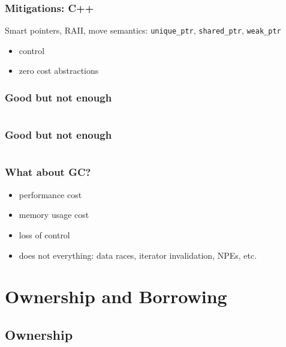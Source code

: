 \documentclass{beamer}
\begin{document}
\begin{frame}
    \begin{multicols}{2}
        \inputminted[fontsize=\tiny]{c}{code/vec_no_comment.c}
    \end{multicols}
\end{frame}

\begin{frame}
    \begin{multicols}{2}
        \inputminted[fontsize=\tiny]{c}{code/vec.c}
    \end{multicols}
\end{frame}

\begin{frame}
    \frametitle{Mitigations: C++}
    Smart pointers, RAII, move semantics: \texttt{unique\_ptr},
    \texttt{shared\_ptr}, \texttt{weak\_ptr}

    \begin{itemize}
        \item control
        \item zero cost abstractions
    \end{itemize}
\end{frame}

\begin{frame}
    \frametitle{Good but not enough}
    \inputminted[]{c++}{code/invalid_ref.cpp}
\end{frame}

\begin{frame}
    \frametitle{Good but not enough}
    \inputminted[]{c++}{code/invalid_ref_commented.cpp}
\end{frame}

\begin{frame}
    \frametitle{What about GC?}
    \begin{itemize}
        \item performance cost
        \item memory usage cost
        \item loss of control
        \item does not everything: data races, iterator invalidation, NPEs, etc.
    \end{itemize}
\end{frame}

\section{Ownership and Borrowing}

\subsection{Ownership}
\end{document}
